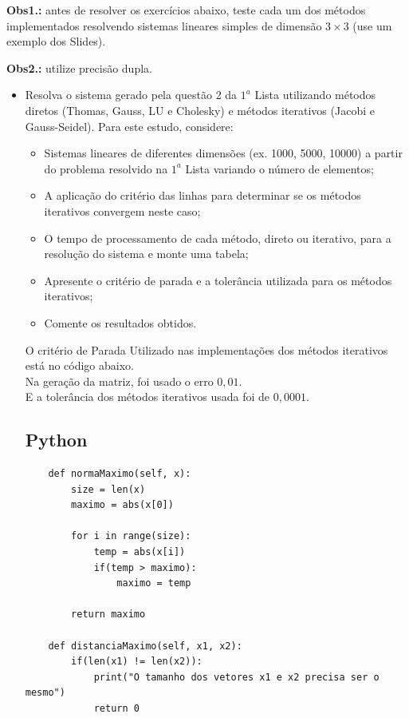 \documentclass{article}
\newcounter{execs}
\newcommand{\exec}[0]{\addtocounter{execs}{1}\item[\textbf{\arabic{execs}.}]}
\begin{document}
\thispagestyle{first}

\noindent \textbf{Obs1.:} antes de resolver os exercícios abaixo, teste cada um dos métodos implementados resolvendo sistemas lineares simples de dimensão $3\times 3$ (use um exemplo dos Slides).

\noindent \textbf{Obs2.:} utilize precisão dupla.
\begin{itemize}

\exec Resolva o sistema gerado pela questão 2 da $1^a$ Lista utilizando métodos diretos (Thomas, Gauss, LU e Cholesky) e métodos iterativos (Jacobi e Gauss-Seidel). Para este estudo, considere:

\begin{itemize}
\item Sistemas lineares de diferentes dimensões (ex. 1000, 5000, 10000) a partir do problema resolvido na $1^a$ Lista variando o número de elementos; 
\item A aplicação do critério das linhas para determinar se os métodos iterativos convergem neste caso;
\item O tempo de processamento de cada método, direto ou iterativo, para a resolução do sistema e monte uma tabela;
\item Apresente o critério de parada e a tolerância utilizada para os métodos iterativos;
\item Comente os resultados obtidos.
\end{itemize}


\text O critério de Parada Utilizado nas implementações dos métodos iterativos está no código abaixo. \\
\text Na geração da matriz, foi usado o erro $0,01$.\\
\text E a tolerância dos métodos iterativos usada foi de $0,0001$. 

\subsection*{Python}
\begin{lstlisting}
    def normaMaximo(self, x):
        size = len(x)
        maximo = abs(x[0])   
        
        for i in range(size):
            temp = abs(x[i])        
            if(temp > maximo):
                maximo = temp
                
        return maximo
        
    def distanciaMaximo(self, x1, x2):
        if(len(x1) != len(x2)):
            print("O tamanho dos vetores x1 e x2 precisa ser o mesmo")
            return 0
            

\end{lstlisting}
\end{itemize}
\end{document}

